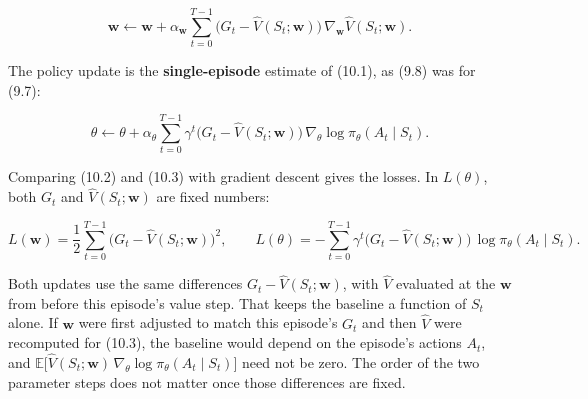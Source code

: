 \begin{equation}
\mathbf{w}
\leftarrow
\mathbf{w}
+
\alpha_{\mathbf{w}}
\sum_{t=0}^{T-1}
\bigl(G_t-\hat{V}(S_t;\mathbf{w})\bigr)\,
\nabla_{\mathbf{w}}\hat{V}(S_t;\mathbf{w}).
\tag{10.2}
\end{equation}

The policy update is the \textbf{single-episode} estimate of (10.1), as (9.8) was for (9.7):

\begin{equation}
\theta
\leftarrow
\theta
+
\alpha_\theta
\sum_{t=0}^{T-1}
\gamma^{t}\bigl(G_t-\hat{V}(S_t;\mathbf{w})\bigr)\,
\nabla_\theta\log\pi_\theta(A_t\mid S_t).
\tag{10.3}
\end{equation}

Comparing (10.2) and (10.3) with gradient descent gives the losses. In $L(\theta)$, both $G_t$ and $\hat{V}(S_t;\mathbf{w})$ are fixed numbers:

\begin{equation}
L(\mathbf{w})
=
\frac12\sum_{t=0}^{T-1}
\bigl(G_t-\hat{V}(S_t;\mathbf{w})\bigr)^2,
\qquad
L(\theta)
=
-\sum_{t=0}^{T-1}
\gamma^{t}\bigl(G_t-\hat{V}(S_t;\mathbf{w})\bigr)\,
\log\pi_\theta(A_t\mid S_t).
\tag{10.4}
\end{equation}

Both updates use the same differences $G_t-\hat{V}(S_t;\mathbf{w})$, with $\hat{V}$ evaluated at the $\mathbf{w}$ from before this episode's value step. That keeps the baseline a function of $S_t$ alone. If $\mathbf{w}$ were first adjusted to match this episode's $G_t$ and then $\hat{V}$ were recomputed for (10.3), the baseline would depend on the episode's actions $A_t$, and $\mathbb{E}\bigl[\hat{V}(S_t;\mathbf{w})\,\nabla_\theta\log\pi_\theta(A_t\mid S_t)\bigr]$ need not be zero. The order of the two parameter steps does not matter once those differences are fixed.

